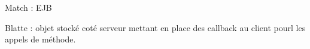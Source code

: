 Match : EJB

Blatte : objet stocké coté serveur mettant en place des callback au client pourl les appels de méthode.

